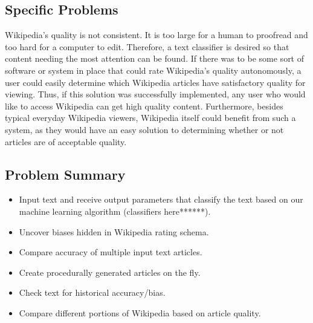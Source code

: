 \documentclass[10pt]{article}
\begin{document}
\subsection*{Specific Problems}
\hspace*{28pt}Wikipedia's quality is not consistent. It is too large for a human to proofread and too hard for a computer to edit. Therefore, a text classifier is desired so that content needing the most attention can be found. If there was to be some sort of software or system in place that could rate Wikipedia’s quality autonomously, a user could easily determine which Wikipedia articles have satisfactory quality for viewing. Thus, if this solution was successfully implemented, any user who would like to access Wikipedia can get high quality content. Furthermore, besides typical everyday Wikipedia viewers, Wikipedia itself could benefit from such a system, as they would have an easy solution to determining whether or not articles are of acceptable quality.
\subsection*{Problem Summary}
\begin{itemize}
\item Input text and receive output parameters that classify the text based on our machine learning algorithm (classifiers here******).
\item Uncover biases hidden in Wikipedia rating schema.
\item Compare accuracy of multiple input text articles.
\item Create procedurally generated articles on the fly.
\item Check text for historical accuracy/bias.
\item Compare different portions of Wikipedia based on article quality.
\end{itemize}
\end{document}
